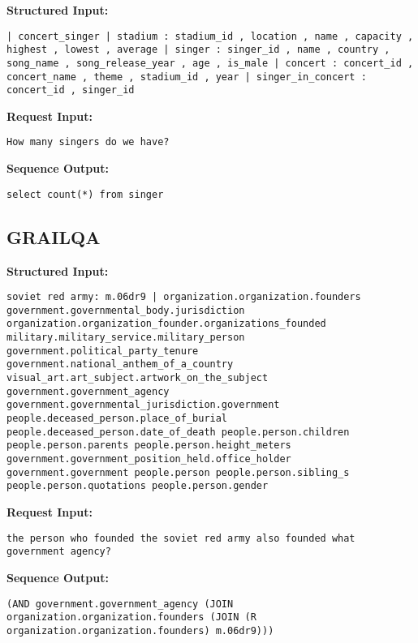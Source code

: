 \documentclass[11pt]{article}
\begin{document}
\textbf{Structured Input:} 

\begin{lstlisting}
| concert_singer | stadium : stadium_id , location , name , capacity , highest , lowest , average | singer : singer_id , name , country , song_name , song_release_year , age , is_male | concert : concert_id , concert_name , theme , stadium_id , year | singer_in_concert : concert_id , singer_id
\end{lstlisting}
\textbf{Request Input:} 
\begin{lstlisting}
How many singers do we have?
\end{lstlisting}
\textbf{Sequence Output:} 
\begin{lstlisting}
select count(*) from singer
\end{lstlisting}

\subsection{GRAILQA}

\textbf{Structured Input:} 

\begin{lstlisting}
soviet red army: m.06dr9 | organization.organization.founders government.governmental_body.jurisdiction organization.organization_founder.organizations_founded military.military_service.military_person government.political_party_tenure government.national_anthem_of_a_country visual_art.art_subject.artwork_on_the_subject government.government_agency government.governmental_jurisdiction.government people.deceased_person.place_of_burial people.deceased_person.date_of_death people.person.children people.person.parents people.person.height_meters government.government_position_held.office_holder government.government people.person people.person.sibling_s people.person.quotations people.person.gender
\end{lstlisting}
\textbf{Request Input:} 
\begin{lstlisting}
the person who founded the soviet red army also founded what government agency?
\end{lstlisting}
\textbf{Sequence Output:} 
\begin{lstlisting}
(AND government.government_agency (JOIN organization.organization.founders (JOIN (R organization.organization.founders) m.06dr9)))
\end{lstlisting}
\end{document}
